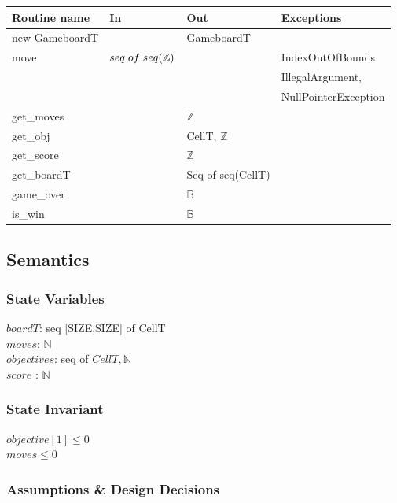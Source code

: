 \documentclass[12pt]{article}
\begin{document}
\begin{tabular}{| l | l | l | p{5cm} |}
\hline
\textbf{Routine name} & \textbf{In} & \textbf{Out} & \textbf{Exceptions}\\
\hline
new GameboardT &  & GameboardT & \\
\hline
move & $seq \thickspace of\thickspace seq(\mathbb{Z})$ & & IndexOutOfBounds\\ & & & IllegalArgument,\\ & & & NullPointerException\\
\hline
get\_moves & & $\mathbb{Z}$ &\\
\hline
get\_obj & & CellT, $\mathbb{Z}$ &\\
\hline
get\_score & & $\mathbb{Z}$ &\\
\hline
get\_boardT & & Seq of seq(CellT) &\\
\hline
game\_over & & $\mathbb{B}$ &\\
\hline
is\_win & & $\mathbb{B}$ &\\
\hline
\end{tabular}

\subsection* {Semantics}

\subsubsection* {State Variables}

$boardT$: seq [SIZE,SIZE] of CellT\\
$moves$: $\mathbb{N}$\\
$objectives$: seq of $CellT,\mathbb{N}$\\
$score$ : $\mathbb{N}$

\subsubsection* {State Invariant}

$objective[1] \leq 0$\\
$moves \leq 0$

\subsubsection* {Assumptions \& Design Decisions}
\end{document}
